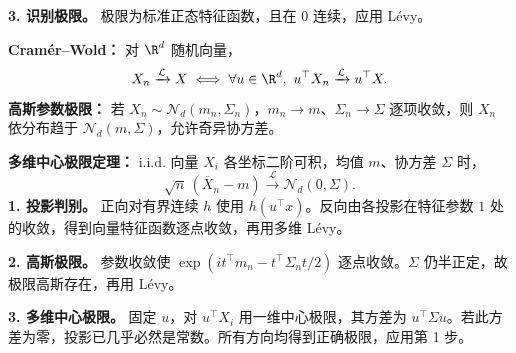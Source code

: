 \textbf{3. 识别极限。} 极限为标准正态特征函数，且在 $0$ 连续，应用 Lévy。

\textbf{Cramér--Wold：} 对 $\R^d$ 随机向量，
\[
X_n\xrightarrow{\mathcal L}X
\iff
\forall u\in\R^d,\ 
u^\top X_n\xrightarrow{\mathcal L}u^\top X.
\]
\textbf{高斯参数极限：} 若 $X_n\sim\mathcal N_d(m_n,\Sigma_n)$，$m_n\to m$、$\Sigma_n\to\Sigma$ 逐项收敛，则 $X_n$ 依分布趋于 $\mathcal N_d(m,\Sigma)$，允许奇异协方差。

\textbf{多维中心极限定理：} i.i.d. 向量 $X_i$ 各坐标二阶可积，均值 $m$、协方差 $\Sigma$ 时，
\[
\sqrt n\,(\overline X_n-m)
\xrightarrow{\mathcal L}\mathcal N_d(0,\Sigma).
\]
\textbf{1. 投影判别。} 正向对有界连续 $h$ 使用 $h(u^\top x)$。反向由各投影在特征参数 $1$ 处的收敛，得到向量特征函数逐点收敛，再用多维 Lévy。

\textbf{2. 高斯极限。} 参数收敛使 $\exp(it^\top m_n-t^\top\Sigma_nt/2)$ 逐点收敛。$\Sigma$ 仍半正定，故极限高斯存在，再用 Lévy。

\textbf{3. 多维中心极限。} 固定 $u$，对 $u^\top X_i$ 用一维中心极限，其方差为 $u^\top\Sigma u$。若此方差为零，投影已几乎必然是常数。所有方向均得到正确极限，应用第 1 步。
